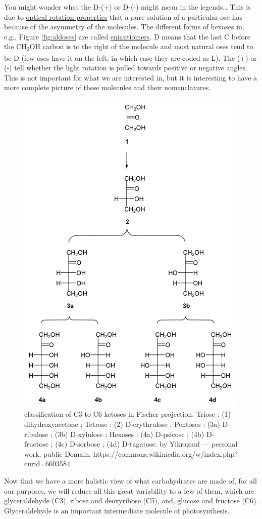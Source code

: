 \documentclass[]{book}
\theoremstyle{definition}
\theoremstyle{definition}
\theoremstyle{definition}
\theoremstyle{remark}
\begin{document}
You might wonder what the D-(+) or D-(-) might mean in the
legends\ldots{} This is due to
\href{https://en.wikipedia.org/wiki/Optical_rotation}{optical rotation
properties} that a pure solution of a particular ose has because of the
asymmetry of the molecules. The different forms of hexoses in, e.g.,
Figure \ref{fig:aldoses} are called
\protect\hyperlink{https:ux2fux2fen.wikipedia.orgux2fwikiux2fEnantiomer}{eniantiomers}.
D means that the last C before the CH\textsubscript{2}OH carbon is to
the right of the molecule and most natural oses tend to be D (few oses
have it on the left, in which case they are coded as L). The (+) or (-)
tell whether the light rotation is pulled towards positive or negative
angles. This is not important for what we are interested in, but it is
interesting to have a more complete picture of these molecules and their
nomenclatures.

\begin{figure}

{\centering \includegraphics[width=0.5\linewidth]{pictures/ketoses} 

}

\caption{classification of C3 to C6 ketoses in Fischer projection. Triose : (1) dihydroxyacetone ; Tetrose : (2) D-erythrulose ; Pentoses : (3a) D-ribulose ; (3b) D-xylulose ; Hexoses : (4a) D-psicose ; (4b) D-fructose ; (4c) D-sorbose ; (4d) D-tagatose. by Yikrazuul — personal work, public Domain, https://commons.wikimedia.org/w/index.php?curid=6603584 }\label{fig:ketoses}
\end{figure}

Now that we have a more holistic view of what carbohydrates are made of,
for all our purposes, we will reduce all this great variability to a few
of them, which are glyceraldehyde (C3), ribose and deoxyribose (C5),
and, glucose and fructose (C6). Glyceraldehyde is an important
intermediate molecule of photosynthesis.
\end{document}
